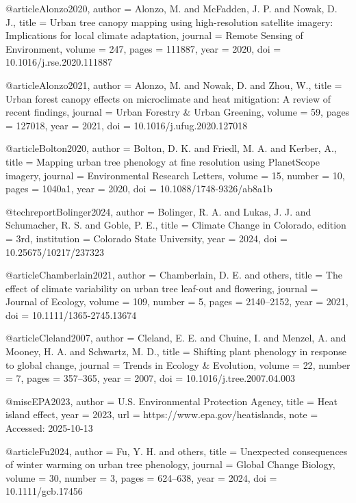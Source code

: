 @article{Alonzo2020,
  author  = {Alonzo, M. and McFadden, J. P. and Nowak, D. J.},
  title   = {Urban tree canopy mapping using high-resolution satellite imagery: Implications for local climate adaptation},
  journal = {Remote Sensing of Environment},
  volume  = {247},
  pages   = {111887},
  year    = {2020},
  doi     = {10.1016/j.rse.2020.111887}
}

@article{Alonzo2021,
  author  = {Alonzo, M. and Nowak, D. and Zhou, W.},
  title   = {Urban forest canopy effects on microclimate and heat mitigation: A review of recent findings},
  journal = {Urban Forestry \& Urban Greening},
  volume  = {59},
  pages   = {127018},
  year    = {2021},
  doi     = {10.1016/j.ufug.2020.127018}
}

@article{Bolton2020,
  author  = {Bolton, D. K. and Friedl, M. A. and Kerber, A.},
  title   = {Mapping urban tree phenology at fine resolution using PlanetScope imagery},
  journal = {Environmental Research Letters},
  volume  = {15},
  number  = {10},
  pages   = {1040a1},
  year    = {2020},
  doi     = {10.1088/1748-9326/ab8a1b}
}

@techreport{Bolinger2024,
  author      = {Bolinger, R. A. and Lukas, J. J. and Schumacher, R. S. and Goble, P. E.},
  title       = {Climate Change in Colorado},
  edition     = {3rd},
  institution = {Colorado State University},
  year        = {2024},
  doi         = {10.25675/10217/237323}
}

@article{Chamberlain2021,
  author  = {Chamberlain, D. E. and others},
  title   = {The effect of climate variability on urban tree leaf-out and flowering},
  journal = {Journal of Ecology},
  volume  = {109},
  number  = {5},
  pages   = {2140--2152},
  year    = {2021},
  doi     = {10.1111/1365-2745.13674}
}

@article{Cleland2007,
  author  = {Cleland, E. E. and Chuine, I. and Menzel, A. and Mooney, H. A. and Schwartz, M. D.},
  title   = {Shifting plant phenology in response to global change},
  journal = {Trends in Ecology \& Evolution},
  volume  = {22},
  number  = {7},
  pages   = {357--365},
  year    = {2007},
  doi     = {10.1016/j.tree.2007.04.003}
}

@misc{EPA2023,
  author = {{U.S. Environmental Protection Agency}},
  title  = {Heat island effect},
  year   = {2023},
  url    = {https://www.epa.gov/heatislands},
  note   = {Accessed: 2025-10-13}
}

@article{Fu2024,
  author  = {Fu, Y. H. and others},
  title   = {Unexpected consequences of winter warming on urban tree phenology},
  journal = {Global Change Biology},
  volume  = {30},
  number  = {3},
  pages   = {624--638},
  year    = {2024},
  doi     = {10.1111/gcb.17456}
}

